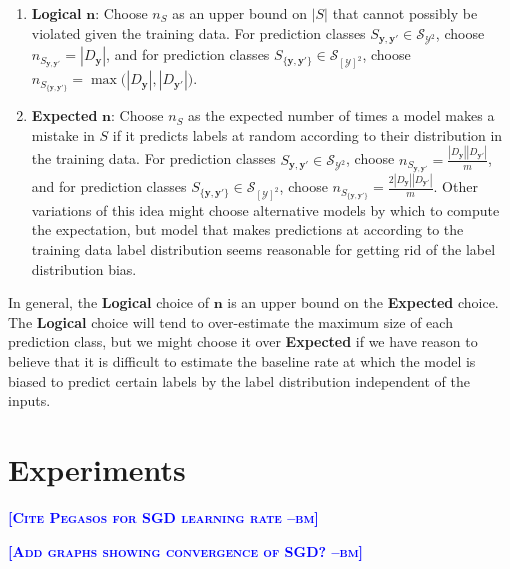 \documentclass{article} %
\newcommand{\bmcomment}[1]{\textcolor{blue}{\textsc{\textbf{[#1 --bm]}}}}
\begin{document}
\begin{enumerate}

\item \textbf{Logical} $\mathbf{n}$: Choose $n_S$ as an upper bound
on $|S|$ that cannot possibly be violated given the training data. 
For prediction classes 
$S_{\mathbf{y},\mathbf{y'}}\in\mathcal{S}_{\mathcal{Y}^2}$, 
choose $n_{S_{\mathbf{y},\mathbf{y'}}}=|D_\mathbf{y}|$, and for prediction 
classes 
$S_{\{\mathbf{y},\mathbf{y'}\}}\in\mathcal{S}_{[\mathcal{Y}]^2}$,
choose 
$n_{S_{\{\mathbf{y},\mathbf{y'}\}}}=
\max\big(|D_\mathbf{y}|,|D_\mathbf{y'}|\big)$.

\item \textbf{Expected} $\mathbf{n}$:  Choose $n_S$ as the expected
number of times a model makes a mistake in $S$ if it predicts labels
at random according to their distribution in the training data. 
For prediction classes 
$S_{\mathbf{y},\mathbf{y'}}\in\mathcal{S}_{\mathcal{Y}^2}$, 
choose $n_{S_{\mathbf{y},\mathbf{y'}}}=
\frac{|D_\mathbf{y}||D_\mathbf{y'}|}{m}$, 
and for prediction classes 
$S_{\{\mathbf{y},\mathbf{y'}\}}\in\mathcal{S}_{[\mathcal{Y}]^2}$,
choose 
$n_{S_{\{\mathbf{y},\mathbf{y'}\}}}=
\frac{2|D_\mathbf{y}||D_\mathbf{y'}|}{m}$.
Other variations of this idea might choose alternative models by which
to compute the expectation, but model that makes predictions at
according to the training data label distribution seems 
reasonable for getting rid of the label distribution bias.

\end{enumerate}

In general, the \textbf{Logical} choice of $\mathbf{n}$ is an upper
bound on the \textbf{Expected} choice.  The \textbf{Logical} choice
will tend to over-estimate the maximum size of each prediction class,
but we might choose it over \textbf{Expected} if we have reason
to believe that it is difficult to estimate the baseline rate at
which the model is biased to predict certain labels by the label
distribution independent of the inputs.

\section{Experiments}

\bmcomment{Cite Pegasos for SGD learning rate}

\bmcomment{Add graphs showing convergence of SGD?}
\end{document}
